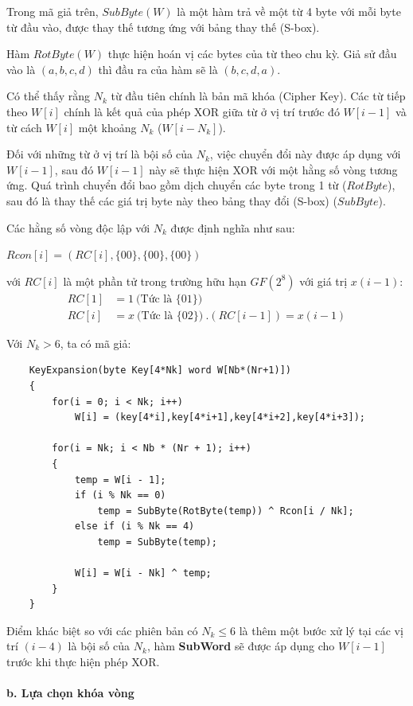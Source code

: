 Trong mã giả trên, $SubByte(W)$ là một hàm trả về một từ 4 byte với mỗi byte từ đầu vào, được thay thế tương ứng với bảng thay thế (S-box). 

Hàm $RotByte(W)$ thực hiện hoán vị các bytes của từ theo chu kỳ. Giả sử đầu vào là $(a,b,c,d)$ thì đầu ra của hàm sẽ là $(b,c,d,a)$.

Có thể thấy rằng $N_k$ từ đầu tiên chính là bản mã khóa (Cipher Key). Các từ tiếp theo $W[i]$ chính là kết quả của phép XOR giữa từ ở vị trí trước đó $W[i-1]$ và từ cách $W[i]$ một khoảng $N_k$ ($W[i-N_k]$).

Đối với những từ ở vị trí là bội số của $N_k$, việc chuyển đổi này được áp dụng với $W[i-1]$, sau đó $W[i-1]$ này sẽ thực hiện XOR với một hằng số vòng tương ứng. Quá trình chuyển đổi bao gồm dịch chuyển các byte trong 1 từ ($RotByte$), sau đó là thay thế các giá trị byte này theo bảng thay đổi (S-box) ($SubByte$).

Các hằng số vòng độc lập với $N_k$ được định nghĩa như sau:
\begin{center}
	$Rcon[i] = (RC[i], \{00\}, \{00\}, \{00\})$
\end{center}
với  $RC[i]$ là một phần tử trong trường hữu hạn $GF(2^8)$ với giá trị $x(i-1)$:
\begin{align*}
	RC[1] &= 1~ \text{(Tức là \{01\})} \\
	RC[i] &= x~ \text{(Tức là \{02\})}~ .(RC[i-1]) = x(i-1)
\end{align*}

Với $N_k > 6$, ta có mã giả:
\begin{center}
	\begin{BVerbatim}
	KeyExpansion(byte Key[4*Nk] word W[Nb*(Nr+1)])
	{	
		for(i = 0; i < Nk; i++)
			W[i] = (key[4*i],key[4*i+1],key[4*i+2],key[4*i+3]);
		
		for(i = Nk; i < Nb * (Nr + 1); i++)
		{
			temp = W[i - 1];	 
		 	if (i % Nk == 0)		
		 		temp = SubByte(RotByte(temp)) ^ Rcon[i / Nk];	
		 	else if (i % Nk == 4) 			
				temp = SubByte(temp);
				
		 	W[i] = W[i - Nk] ^ temp;
		}
	}
	\end{BVerbatim}
\end{center}
Điểm khác biệt so với các phiên bản có $N_k \leq 6$ là thêm một bước xử lý tại các vị trí $(i - 4)$ là bội số của $N_k$, hàm \textbf{SubWord} sẽ được áp dụng cho $W[i-1]$ trước khi thực hiện phép XOR.
 
\paragraph{b. Lựa chọn khóa vòng}\quad

